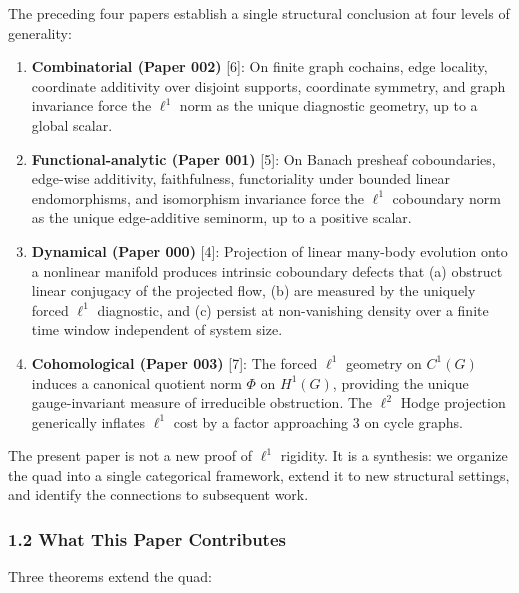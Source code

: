 \documentclass[
]{article}
\begin{document}
The preceding four papers establish a single structural conclusion at
four levels of generality:

\begin{enumerate}
\def\labelenumi{\arabic{enumi}.}
\item
  \textbf{Combinatorial (Paper 002)} {[}6{]}: On finite graph cochains,
  edge locality, coordinate additivity over disjoint supports,
  coordinate symmetry, and graph invariance force the \(\ell^1\) norm as
  the unique diagnostic geometry, up to a global scalar.
\item
  \textbf{Functional-analytic (Paper 001)} {[}5{]}: On Banach presheaf
  coboundaries, edge-wise additivity, faithfulness, functoriality under
  bounded linear endomorphisms, and isomorphism invariance force the
  \(\ell^1\) coboundary norm as the unique edge-additive seminorm, up to
  a positive scalar.
\item
  \textbf{Dynamical (Paper 000)} {[}4{]}: Projection of linear many-body
  evolution onto a nonlinear manifold produces intrinsic coboundary
  defects that (a) obstruct linear conjugacy of the projected flow, (b)
  are measured by the uniquely forced \(\ell^1\) diagnostic, and (c)
  persist at non-vanishing density over a finite time window independent
  of system size.
\item
  \textbf{Cohomological (Paper 003)} {[}7{]}: The forced \(\ell^1\)
  geometry on \(C^1(G)\) induces a canonical quotient norm \(\Phi\) on
  \(H^1(G)\), providing the unique gauge-invariant measure of
  irreducible obstruction. The \(\ell^2\) Hodge projection generically
  inflates \(\ell^1\) cost by a factor approaching 3 on cycle graphs.
\end{enumerate}

The present paper is not a new proof of \(\ell^1\) rigidity. It is a
synthesis: we organize the quad into a single categorical framework,
extend it to new structural settings, and identify the connections to
subsequent work.

\subsubsection{1.2 What This Paper
Contributes}\label{what-this-paper-contributes}

Three theorems extend the quad:
\end{document}
